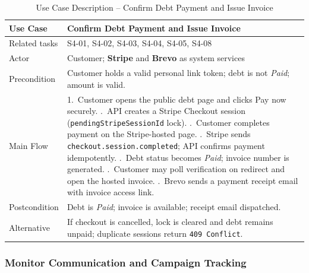 \documentclass[12pt,a4paper]{report}
\newcommand{\reporttablesetup}{%
  \small%
  \setlength{\tabcolsep}{5pt}%
  \renewcommand{\arraystretch}{1.22}%
  \arrayrulecolor{framegray}%
}
\begin{document}
\begin{table}[H]
  \centering
  \reporttablesetup
  \begin{tabularx}{\textwidth}{|p{3.1cm}|Y|}
    \hline
    Use Case      & Confirm Debt Payment and Issue Invoice \\
    \hline
    Related tasks & S4-01, S4-02, S4-03, S4-04, S4-05, S4-08 \\
    \hline
    Actor         & Customer; \textbf{Stripe} and \textbf{Brevo} as system services \\
    \hline
    Precondition  & Customer holds a valid personal link token; debt is not
                    \textit{Paid}; amount is valid. \\
    \hline
    Main Flow     & 1.\ Customer opens the public debt page and clicks Pay now
                        securely. .\ API creates a Stripe Checkout session
                        (\texttt{pendingStripeSessionId} lock). .\ Customer completes payment on the Stripe-hosted page. .\ Stripe sends \texttt{checkout.session.completed}; API
                        confirms payment idempotently. .\ Debt status becomes \textit{Paid}; invoice number is
                        generated. .\ Customer may poll verification on redirect and open the
                        hosted invoice. .\ Brevo sends a payment receipt email with invoice access link.
    \\
    \hline
    Postcondition & Debt is \textit{Paid}; invoice is available; receipt email
                    dispatched. \\
    \hline
    Alternative   & If checkout is cancelled, lock is cleared and debt remains unpaid;
                    duplicate sessions return \texttt{409 Conflict}. \\
    \hline
  \end{tabularx}
  \caption{Use Case Description -- Confirm Debt Payment and Issue Invoice}
  \label{tab:uc09}
\end{table}

\subsubsection{Monitor Communication and Campaign Tracking}
\end{document}

